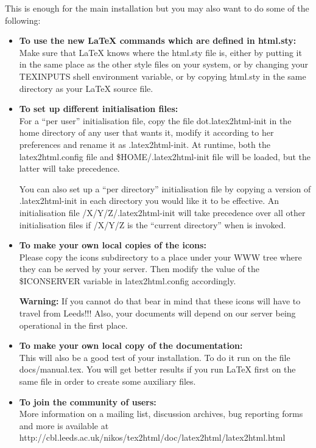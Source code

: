This is enough for the main installation but you may also 
want to do some of the following:
\begin{itemize}

\item {\bf To use the new LaTeX commands which are defined in {\fn html.sty}:} \\
Make sure that LaTeX knows where the html.sty
file is, either by putting it in the same place as the other style files on
your system, or by changing your TEXINPUTS shell environment variable,
or by copying html.sty in the same directory as your LaTeX source file.

\item {\bf To set up different initialisation files:} \\
For a ``per user'' initialisation file, 
copy the file {\fn dot.latex2html-init} in the home directory
of any user that wants it, modify it according to her preferences and
rename it as {\fn .latex2html-init}. At runtime, both the {\fn 
latex2html.config} file and {\fn \$HOME/.latex2html-init} file will be
loaded, but the latter will take precedence.

You can also set up a ``per directory'' initialisation file by 
copying a version of {\fn .latex2html-init} in each directory you
would like it to be effective. An initialisation file
{\fn /X/Y/Z/.latex2html-init} will take precedence over all other
initialisation files if {\fn /X/Y/Z} is the ``current directory'' when
\latextohtml is invoked.

\item {\bf To make your own local copies of the \latextohtml icons:} \\
Please copy the {\fn icons} subdirectory to a 
place under your WWW tree
where they can be served by your server.
Then modify the value of the {\fn \$ICONSERVER} variable in 
{\fn latex2html.config} accordingly. 

{\bf Warning:} If you cannot do that
bear in mind that these icons will have
to travel from Leeds!!! Also, your documents will depend on our
server being operational in the first place.

\item  {\bf To make your own local copy of the \latextohtml
documentation:} \\
This will also be a good test of your installation. 
To do it run \latextohtml on the file {\fn docs/manual.tex}.
You will get better results if you run LaTeX first on the 
same file in order to create some auxiliary files.

\item {\bf To join the community of \latextohtml users:} \\
More information on a mailing list, discussion archives, bug reporting
forms and more is available at \\
{http://cbl.leeds.ac.uk/nikos/tex2html/doc/latex2html/latex2html.html}
\end{itemize}


